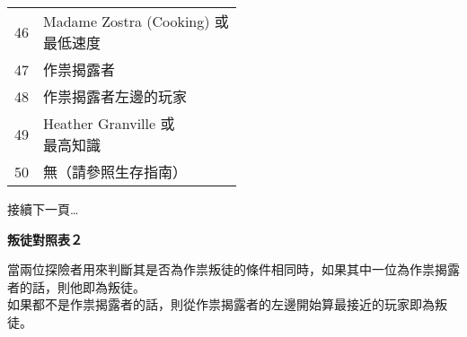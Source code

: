 \begin{center}
\begin{minipage}[t]{.45\textwidth}
\begin{tabular}[t]{ c l }
        46 & \makecell[tl]{Madame Zostra (Cooking) 或 \\ 最低速度} \\
        47 & 作祟揭露者 \\
        48 & 作祟揭露者左邊的玩家 \\
        49 & \makecell[tl]{Heather Granville 或 \\ 最高知識} \\
        50 & 無（請參照生存指南） \\
    \end{tabular}
  \end{minipage}
\end{center}

\vfill\hfill 接續下一頁…
\pagebreak

\begin{center}
  \Huge\bfseries 叛徒對照表２
\end{center}
當兩位探險者用來判斷其是否為作祟叛徒的條件相同時，如果其中一位為作祟揭露者的話，則他即為叛徒。 \\
如果都不是作祟揭露者的話，則從作祟揭露者的左邊開始算最接近的玩家即為叛徒。


